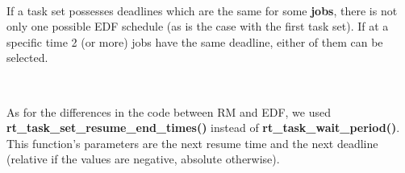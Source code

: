 \begin{RTGrid}[width=10cm]{3}{20}







\end{RTGrid}

\begin{RTGrid}[width=10cm]{3}{22}







\end{RTGrid}
\

\begin{framewarning}
If a task set possesses deadlines  which are the same for some \textbf{jobs}, there is not only one possible EDF schedule (as is the case with the first task set). If at a specific time 2 (or more) jobs have the same deadline, either of them can be selected.
\end{framewarning}
\

As for the differences in the code between RM and EDF, we used \textbf{rt\_task\_set\_resume\_end\_times()} instead of \textbf{rt\_task\_wait\_period()}. This function's parameters are the next resume time and the next deadline (relative if the values are negative, absolute otherwise).

